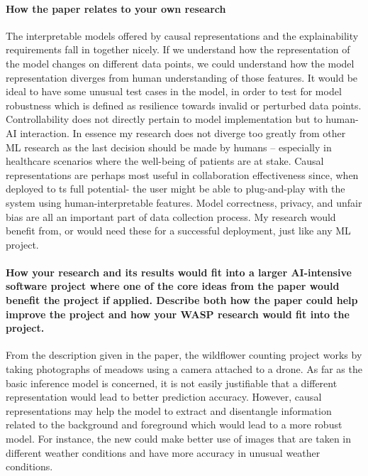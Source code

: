 \documentclass[pra, onecolumn,superscriptaddress,nofootinbib]{revtex4}
\begin{document}
          
\paragraph{How the paper relates to your own research\\}

    The interpretable models offered by causal representations and the explainability requirements fall in together nicely. If we understand how the representation of the model changes on different data points, we could understand how the model representation diverges from human understanding of those features. It would be ideal to have some unusual test cases in the model, in order to test for model robustness which is defined as resilience towards invalid or perturbed data points. Controllability does not directly pertain to model implementation but to human-AI interaction. In essence my research does not diverge too greatly from other ML research as the last decision should be made by humans -- especially in healthcare scenarios where the well-being of patients are at stake. Causal representations are perhaps most useful in collaboration effectiveness since, when deployed to ts full potential- the user might be able to plug-and-play with the system using human-interpretable features. Model correctness, privacy, and unfair bias are all an important part of  data collection process. My research would benefit from, or would need these for a successful deployment, just like any ML project.\\
  
  
\paragraph{How your research and its results would fit into a larger AI-intensive software project where one of the core ideas from the paper would benefit the project if applied. Describe both how the paper could help improve the project and how your WASP research would fit into the project.\\}

    From the description given in the paper, the wildflower counting project works by taking photographs of meadows using a camera attached to a drone. As far as the basic inference model is concerned, it is not easily justifiable that a different representation would lead to better prediction accuracy. However, causal representations may help the model to extract and disentangle information related to the background and foreground which would lead to a more robust model. For instance, the new could make better use of images that are taken in different weather conditions and have more accuracy in unusual weather conditions.\\
  
\end{document}
